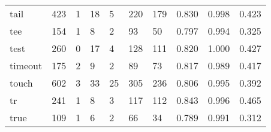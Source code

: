 \begin{longtable}{lp{1.3cm}p{1.3cm}p{1.3cm}p{1.3cm}p{1.3cm}p{1.3cm}p{1.3cm}p{1.3cm}p{1.3cm}}
tail      &                    423 &                                  1 &                                18 &                                5 &                               220 &                             179 &                                   0.830 &                                  0.998 &                                0.423 \\
tee       &                    154 &                                  1 &                                 8 &                                2 &                                93 &                              50 &                                   0.797 &                                  0.994 &                                0.325 \\
test      &                    260 &                                  0 &                                17 &                                4 &                               128 &                             111 &                                   0.820 &                                  1.000 &                                0.427 \\
timeout   &                    175 &                                  2 &                                 9 &                                2 &                                89 &                              73 &                                   0.817 &                                  0.989 &                                0.417 \\
touch     &                    602 &                                  3 &                                33 &                               25 &                               305 &                             236 &                                   0.806 &                                  0.995 &                                0.392 \\
tr        &                    241 &                                  1 &                                 8 &                                3 &                               117 &                             112 &                                   0.843 &                                  0.996 &                                0.465 \\
true      &                    109 &                                  1 &                                 6 &                                2 &                                66 &                              34 &                                   0.789 &                                  0.991 &                                0.312 \\

\end{longtable}
